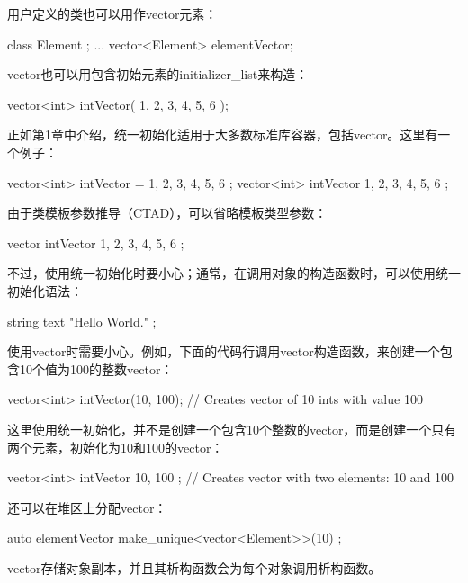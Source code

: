 用户定义的类也可以用作vector元素：

\begin{cpp}
class Element { };
...
vector<Element> elementVector;
\end{cpp}

vector也可以用包含初始元素的initializer\_list来构造：

\begin{cpp}
vector<int> intVector({ 1, 2, 3, 4, 5, 6 });
\end{cpp}

正如第1章中介绍，统一初始化适用于大多数标准库容器，包括vector。这里有一个例子：

\begin{cpp}
vector<int> intVector = { 1, 2, 3, 4, 5, 6 };
vector<int> intVector { 1, 2, 3, 4, 5, 6 };
\end{cpp}

由于类模板参数推导（CTAD），可以省略模板类型参数：

\begin{cpp}
vector intVector { 1, 2, 3, 4, 5, 6 };
\end{cpp}

不过，使用统一初始化时要小心；通常，在调用对象的构造函数时，可以使用统一初始化语法：

\begin{cpp}
string text { "Hello World." };
\end{cpp}

使用vector时需要小心。例如，下面的代码行调用vector构造函数，来创建一个包含10个值为100的整数vector：

\begin{cpp}
vector<int> intVector(10, 100); // Creates vector of 10 ints with value 100
\end{cpp}

这里使用统一初始化，并不是创建一个包含10个整数的vector，而是创建一个只有两个元素，初始化为10和100的vector：

\begin{cpp}
vector<int> intVector { 10, 100 }; // Creates vector with two elements: 10 and 100
\end{cpp}

还可以在堆区上分配vector：

\begin{cpp}
auto elementVector { make_unique<vector<Element>>(10) };
\end{cpp}


vector存储对象副本，并且其析构函数会为每个对象调用析构函数。

